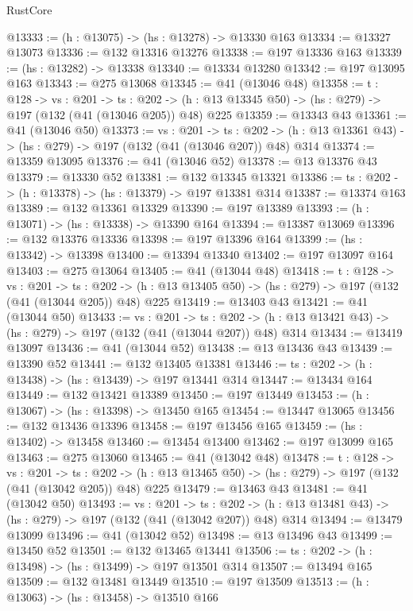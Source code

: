 \begin{lexlean}{RustCore}
\begin{coremodule}
@13333 := (h : @13075) -> (hs : @13278) -> @13330 @163
@13334 := @13327 @13073
@13336 := @132 @13316 @13276
@13338 := @197 @13336 @163
@13339 := (hs : @13282) -> @13338
@13340 := @13334 @13280
@13342 := @197 @13095 @163
@13343 := @275 @13068
@13345 := @41 (@13046 @48)
@13358 := {t : @128} ->
  {vs : @201} ->
  {ts : @202} -> (h : @13 @13345 @50) -> (hs : @279) -> @197 (@132 (@41 (@13046 @205)) @48) @225
@13359 := @13343 @43
@13361 := @41 (@13046 @50)
@13373 := {vs : @201} ->
  {ts : @202} -> (h : @13 @13361 @43) -> (hs : @279) -> @197 (@132 (@41 (@13046 @207)) @48) @314
@13374 := @13359 @13095
@13376 := @41 (@13046 @52)
@13378 := @13 @13376 @43
@13379 := @13330 @52
@13381 := @132 @13345 @13321
@13386 := {ts : @202} -> (h : @13378) -> (hs : @13379) -> @197 @13381 @314
@13387 := @13374 @163
@13389 := @132 @13361 @13329
@13390 := @197 @13389
@13393 := (h : @13071) -> (hs : @13338) -> @13390 @164
@13394 := @13387 @13069
@13396 := @132 @13376 @13336
@13398 := @197 @13396 @164
@13399 := (hs : @13342) -> @13398
@13400 := @13394 @13340
@13402 := @197 @13097 @164
@13403 := @275 @13064
@13405 := @41 (@13044 @48)
@13418 := {t : @128} ->
  {vs : @201} ->
  {ts : @202} -> (h : @13 @13405 @50) -> (hs : @279) -> @197 (@132 (@41 (@13044 @205)) @48) @225
@13419 := @13403 @43
@13421 := @41 (@13044 @50)
@13433 := {vs : @201} ->
  {ts : @202} -> (h : @13 @13421 @43) -> (hs : @279) -> @197 (@132 (@41 (@13044 @207)) @48) @314
@13434 := @13419 @13097
@13436 := @41 (@13044 @52)
@13438 := @13 @13436 @43
@13439 := @13390 @52
@13441 := @132 @13405 @13381
@13446 := {ts : @202} -> (h : @13438) -> (hs : @13439) -> @197 @13441 @314
@13447 := @13434 @164
@13449 := @132 @13421 @13389
@13450 := @197 @13449
@13453 := (h : @13067) -> (hs : @13398) -> @13450 @165
@13454 := @13447 @13065
@13456 := @132 @13436 @13396
@13458 := @197 @13456 @165
@13459 := (hs : @13402) -> @13458
@13460 := @13454 @13400
@13462 := @197 @13099 @165
@13463 := @275 @13060
@13465 := @41 (@13042 @48)
@13478 := {t : @128} ->
  {vs : @201} ->
  {ts : @202} -> (h : @13 @13465 @50) -> (hs : @279) -> @197 (@132 (@41 (@13042 @205)) @48) @225
@13479 := @13463 @43
@13481 := @41 (@13042 @50)
@13493 := {vs : @201} ->
  {ts : @202} -> (h : @13 @13481 @43) -> (hs : @279) -> @197 (@132 (@41 (@13042 @207)) @48) @314
@13494 := @13479 @13099
@13496 := @41 (@13042 @52)
@13498 := @13 @13496 @43
@13499 := @13450 @52
@13501 := @132 @13465 @13441
@13506 := {ts : @202} -> (h : @13498) -> (hs : @13499) -> @197 @13501 @314
@13507 := @13494 @165
@13509 := @132 @13481 @13449
@13510 := @197 @13509
@13513 := (h : @13063) -> (hs : @13458) -> @13510 @166

\end{coremodule}
\end{lexlean}

